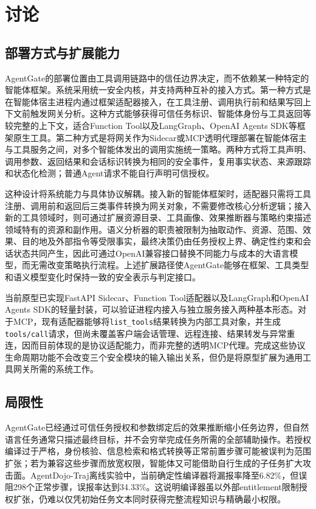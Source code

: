 \section{讨论}
\label{sec:discussion}

\subsection{部署方式与扩展能力}
\label{subsec:deployment-extensibility}

AgentGate的部署位置由工具调用链路中的信任边界决定，而不依赖某一种特定的智能体框架。系统采用统一安全内核，并支持两种互补的接入方式。第一种方式是在智能体宿主进程内通过框架适配器接入，在工具注册、调用执行前和结果写回上下文前触发网关分析。这种方式能够获得可信任务标识、智能体身份与工具返回等较完整的上下文，适合Function Tool以及LangGraph、OpenAI Agents SDK等框架原生工具。第二种方式是将网关作为Sidecar或MCP透明代理部署在智能体宿主与工具服务之间，对多个智能体发出的调用实施统一策略。两种方式将工具声明、调用参数、返回结果和会话标识转换为相同的安全事件，复用事实状态、来源跟踪和状态化检测；普通Agent请求不能自行声明可信授权。

这种设计将系统能力与具体协议解耦。接入新的智能体框架时，适配器只需将工具注册、调用前和返回后三类事件转换为网关对象，不需要修改核心分析逻辑；接入新的工具领域时，则可通过扩展资源目录、工具画像、效果推断器与策略约束描述领域特有的资源和副作用。语义分析器的职责被限制为抽取动作、资源、范围、效果、目的地及外部指令等受限事实，最终决策仍由任务授权上界、确定性约束和会话状态共同产生，因此可通过OpenAI兼容接口替换不同能力与成本的大语言模型，而无需改变策略执行流程。上述扩展路径使AgentGate能够在框架、工具类型和语义模型变化时保持一致的安全表示与判定接口。

当前原型已实现FastAPI Sidecar、Function Tool适配器以及LangGraph和OpenAI Agents SDK的轻量封装，可以验证进程内接入与独立服务接入两种基本形态。对于MCP，现有适配器能够将\texttt{list\_tools}结果转换为内部工具对象，并生成\texttt{tools/call}请求，但尚未覆盖客户端会话管理、远程连接、结果转发与异常重连，因而目前体现的是协议适配能力，而非完整的透明MCP代理。完成这些协议生命周期功能不会改变三个安全模块的输入输出关系，但仍是将原型扩展为通用工具网关所需的系统工作。

\subsection{局限性}
\label{subsec:limitations}

AgentGate已经通过可信任务授权和参数绑定后的效果推断缩小任务边界，但自然语言任务通常只描述最终目标，并不会穷举完成任务所需的全部辅助操作。若授权编译过于严格，身份核验、信息检索和格式转换等正常前置步骤可能被误判为范围扩张；若为兼容这些步骤而放宽权限，智能体又可能借助自行生成的子任务扩大攻击面。AgentDojo-Traj离线实验中，当前确定性编译器将漏报率降至6.82\%，但误阻298个正常步骤，误报率达到34.33\%。这说明编译器虽以外部entitlement限制授权扩张，仍难以仅凭初始任务文本同时获得完整流程知识与精确最小权限。

